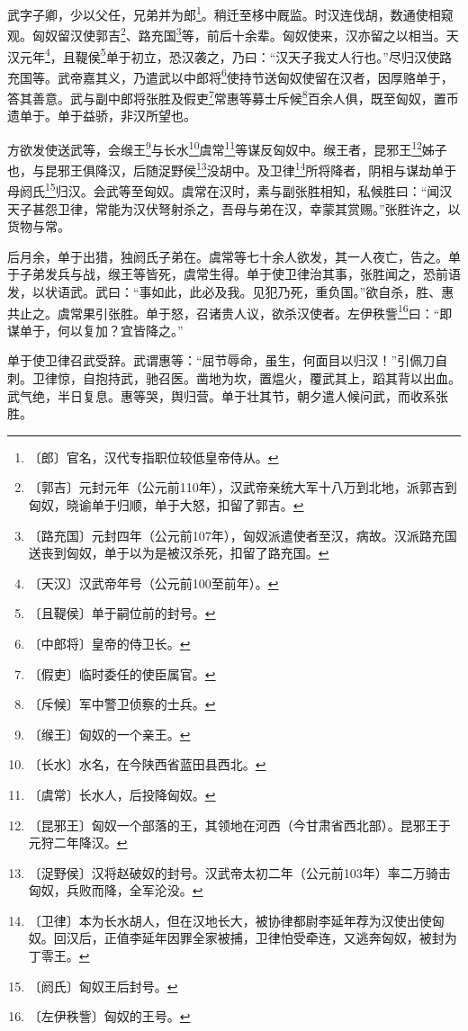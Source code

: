 \documentclass[12pt,UTF-8,openany,a4]{ctexbook}
\begin{document}
\begin{large}
    
    武字子卿，少以父任，兄弟并为郎\footnote{〔郎〕\yiwen 官名，汉代专指职位较低皇帝侍从。}。稍迁至栘中厩监。时汉连伐胡，数通使相窥观。匈奴留汉使郭吉\footnote{〔郭吉〕\yiwen 元封元年（公元前110年），汉武帝亲统大军十八万到北地，派郭吉到匈奴，晓谕单于归顺，单于大怒，扣留了郭吉。}、路充国\footnote{〔路充国〕\yiwen 元封四年（公元前107年），匈奴派遣使者至汉，病故。汉派路充国送丧到匈奴，单于以为是被汉杀死，扣留了路充国。}等，前后十余辈。匈奴使来，汉亦留之以相当。天汉元年\footnote{〔天汉〕\yiwen 汉武帝年号（公元前100至前年）。}，且鞮侯\footnote{〔且鞮侯〕\yiwen 单于嗣位前的封号。}单于初立，恐汉袭之，乃曰：“汉天子我丈人行也。”尽归汉使路充国等。武帝嘉其义，乃遣武以中郎将\footnote{〔中郎将〕\yiwen 皇帝的侍卫长。}使持节送匈奴使留在汉者，因厚赂单于，答其善意。武与副中郎将张胜及假吏\footnote{〔假吏〕\yiwen 临时委任的使臣属官。}常惠等募士斥候\footnote{〔斥候〕\yiwen 军中警卫侦察的士兵。}百余人俱，既至匈奴，置币遗单于。单于益骄，非汉所望也。
    
    方欲发使送武等，会缑王\footnote{〔缑王〕\yiwen 匈奴的一个亲王。}与长水\footnote{〔长水〕\yiwen 水名，在今陕西省蓝田县西北。}虞常\footnote{〔虞常〕\yiwen 长水人，后投降匈奴。}等谋反匈奴中。缑王者，昆邪王\footnote{〔昆邪王〕\yiwen 匈奴一个部落的王，其领地在河西（今甘肃省西北部）。昆邪王于元狩二年降汉。}姊子也，与昆邪王俱降汉，后随浞野侯\footnote{〔浞野侯〕\yiwen 汉将赵破奴的封号。汉武帝太初二年（公元前103年）率二万骑击匈奴，兵败而降，全军沦没。}没胡中。及卫律\footnote{〔卫律〕\yiwen 本为长水胡人，但在汉地长大，被协律都尉李延年荐为汉使出使匈奴。回汉后，正值李延年因罪全家被捕，卫律怕受牵连，又逃奔匈奴，被封为丁零王。}所将降者，阴相与谋劫单于母阏氏\footnote{〔阏氏〕\yiwen 匈奴王后封号。}归汉。会武等至匈奴。虞常在汉时，素与副张胜相知，私候胜曰：“闻汉天子甚怨卫律，常能为汉伏弩射杀之，吾母与弟在汉，幸蒙其赏赐。”张胜许之，以货物与常。
    
    后月余，单于出猎，独阏氏子弟在。虞常等七十余人欲发，其一人夜亡，告之。单于子弟发兵与战，缑王等皆死，虞常生得。单于使卫律治其事，张胜闻之，恐前语发，以状语武。武曰：“事如此，此必及我。见犯乃死，重负国。”欲自杀，胜、惠共止之。虞常果引张胜。单于怒，召诸贵人议，欲杀汉使者。左伊秩訾\footnote{〔左伊秩訾〕\yiwen 匈奴的王号。}曰：“即谋单于，何以复加？宜皆降之。”
    
    单于使卫律召武受辞。武谓惠等：“屈节辱命，虽生，何面目以归汉！”引佩刀自刺。卫律惊，自抱持武，驰召医。凿地为坎，置煴火，覆武其上，蹈其背以出血。武气绝，半日复息。惠等哭，舆归营。单于壮其节，朝夕遣人候问武，而收系张胜。
    

\end{large}
\end{document}

